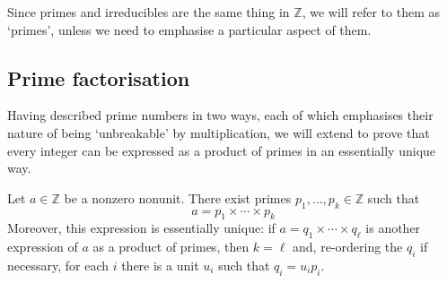 Since primes and irreducibles are the same thing in $\mathbb{Z}$, we will refer to them as `primes', unless we need to emphasise a particular aspect of them.

\subsection*{Prime factorisation}

Having described prime numbers in two ways, each of which emphasises their nature of being `unbreakable' by multiplication, we will extend  to prove that every integer can be expressed as a product of primes in an essentially unique way.

\begin{theorem}
\label{thmFTA}
Let $a \in \mathbb{Z}$ be a nonzero nonunit. There exist primes $p_1, \dots, p_k \in \mathbb{Z}$ such that
\[ a = p_1 \times \cdots \times p_k \]
Moreover, this expression is essentially unique: if $a=q_1 \times \cdots \times q_{\ell}$ is another expression of $a$ as a product of primes, then $k = \ell$ and, re-ordering the $q_i$ if necessary, for each $i$ there is a unit $u_i$ such that $q_i=u_ip_i$.
\end{theorem}

